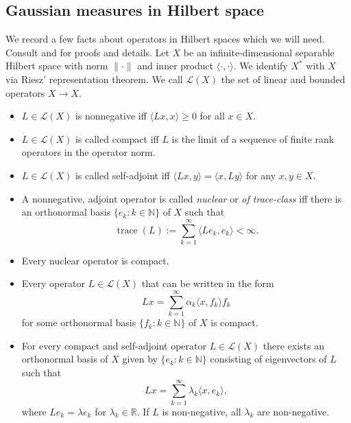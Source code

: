 \documentclass{scrartcl}
\theoremstyle{definition}
\theoremstyle{remark}
\newcommand{\N}{\mathbb N}
\newcommand{\R}{\mathbb R}
\begin{document}
\subsection{Gaussian measures in Hilbert space}
We record a few facts about operators in Hilbert spaces which we will need. Consult \cite{Lunardi} and \cite{brezis2010functional} for proofs and details. Let $X$ be an infinite-dimensional separable Hilbert space with norm $\|\cdot\|$ and inner product $\langle\cdot,\cdot\rangle$. We identify $X^*$ with $X$ via Riesz' representation theorem. We call $\mathcal L(X)$ the set of linear and bounded operators $X\to X$.
\begin{itemize}
\item $L\in \mathcal L(X)$ is nonnegative iff $\langle Lx,x\rangle \geq 0$ for all $x\in X$.
\item $L\in \mathcal L(X)$ is called compact iff $L$ is the limit of a sequence of finite rank operators in the operator norm.
\item $L\in \mathcal L(X)$ is called self-adjoint iff $\langle Lx, y\rangle = \langle x, Ly\rangle$ for any $x,y\in X$.
\item A nonnegative, adjoint operator is called \textit{nuclear} or \textit{of trace-class} iff there is an orthonormal basis $\{e_k: k\in\N\}$ of $X$ such that 
\[\operatorname{trace}(L) := \sum_{k=1}^\infty \langle Le_k,e_k\rangle < \infty.\]
\item Every nuclear operator is compact.
\item Every operator $L\in\mathcal L(X)$ that can be written in the form
\[Lx = \sum_{k=1}^\infty \alpha_k \langle x, f_k\rangle f_k \]
for some orthonormal basis $\{f_k:k\in\N\}$ of $X$ is compact.
\item For every compact and self-adjoint operator $L\in\mathcal L(X)$ there exists an orthonormal basis of $X$ given by $\{e_k:k\in\N\}$ consisting of eigenvectors of $L$ such that 
\begin{equation}\label{eq:formGaussianHilbert} Lx = \sum_{k=1}^\infty \lambda_k \langle x, e_k\rangle,
\end{equation}
where $Le_k = \lambda e_k$ for $\lambda_k\in\R$. If $L$ is non-negative, all $\lambda_k$ are non-negative.

\end{itemize}
\end{document}
